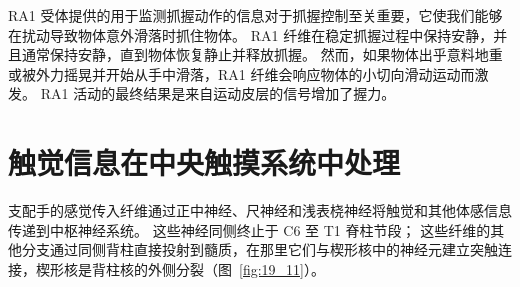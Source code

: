 RA1 受体提供的用于监测抓握动作的信息对于抓握控制至关重要，它使我们能够在扰动导致物体意外滑落时抓住物体。
RA1 纤维在稳定抓握过程中保持安静，并且通常保持安静，直到物体恢复静止并释放抓握。
然而，如果物体出乎意料地重或被外力摇晃并开始从手中滑落，RA1 纤维会响应物体的小切向滑动运动而激发。 
RA1 活动的最终结果是来自运动皮层的信号增加了握力。



\section{触觉信息在中央触摸系统中处理}

支配手的感觉传入纤维通过正中神经、尺神经和浅表桡神经将触觉和其他体感信息传递到中枢神经系统。
这些神经同侧终止于 C6 至 T1 脊柱节段；
这些纤维的其他分支通过同侧背柱直接投射到髓质，在那里它们与楔形核中的神经元建立突触连接，楔形核是背柱核的外侧分裂（图~\ref{fig:19_11}）。



